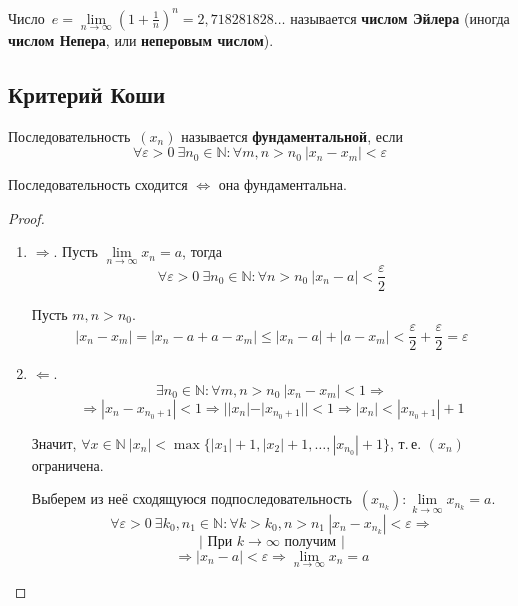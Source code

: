   Число~$e = \lim\limits_{n \to \infty} \left( 1 + \frac1n \right)^n = 2{,}718281828\ldots$ называется \textbf{числом Эйлера} (иногда \textbf{числом Непера}, или \textbf{неперовым числом}).

\subsection{Критерий Коши}
 Последовательность~$(x_n)$ называется \textbf{фундаментальной}, если
\begin{equation*}
\forall \varepsilon > 0 \ \exists n_0 \in \mathbb N \colon \forall m, n > n_0 \ |x_n - x_m| < \varepsilon
\end{equation*}

\begin{theorem}
\label{th:Cauchy_criterion}
Последовательность сходится $\Leftrightarrow$ она фундаментальна.
\end{theorem}
\begin{proof}
\begin{enumerate}
	\item $\Rightarrow$. Пусть $\lim\limits_{n \to \infty} x_n = a$, тогда
	\begin{equation*}
	\forall \varepsilon > 0 \ \exists n_0 \in \mathbb N \colon \forall n > n_0 \ |x_n - a| < \frac\varepsilon2
	\end{equation*}
	
	Пусть $m, n > n_0$.
	\begin{equation*}
	|x_n - x_m| = |x_n - a + a - x_m| \leqslant |x_n - a| + |a - x_m| < \frac\varepsilon2 + \frac\varepsilon2 = \varepsilon
	\end{equation*}
	
	\item $\Leftarrow$.
	\begin{equation*}
	\exists n_0 \in \mathbb N \colon \forall m, n > n_0 \ |x_n - x_m| < 1 \Rightarrow
	\end{equation*}
	\begin{equation*}
	\Rightarrow |x_n - x_{n_0 + 1}| < 1 \Rightarrow
	||x_n| - |x_{n_0 + 1}|| < 1 \Rightarrow
	|x_n| < |x_{n_0 + 1}| + 1
	\end{equation*}
	
	Значит, $\forall x \in \mathbb N \ |x_n| < \max \{ |x_1| + 1, |x_2| + 1, \ldots, |x_{n_0}| + 1 \}$, т.\,е. $(x_n)$ ограничена.
	
	Выберем из неё сходящуюся подпоследовательность~$(x_{n_k}): \lim\limits_{k \to \infty} x_{n_k} = a$.
	\begin{equation*}
	\forall \varepsilon > 0 \ \exists k_0, n_1 \in \mathbb N \colon \forall k > k_0, n > n_1 \ |x_n - x_{n_k}| < \varepsilon \Rightarrow
	\end{equation*}
	\begin{equation*}
	\left| \text{ При } k \to \infty \text{ получим } \right|
	\end{equation*}
	\begin{equation*}
	\Rightarrow |x_n - a| < \varepsilon \Rightarrow
	\lim_{n \to \infty} x_n = a
	\end{equation*}
\end{enumerate}
\end{proof}